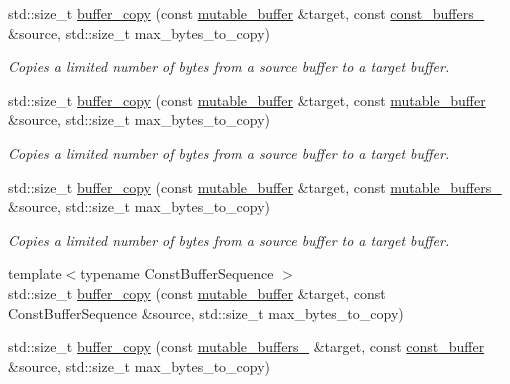\begin{DoxyCompactItemize}
std\+::size\+\_\+t \hyperlink{group__buffer__copy_ga9e6ea40e73105d4a5a73b24320feb59d}{buffer\+\_\+copy} (const \hyperlink{classasio_1_1mutable__buffer}{mutable\+\_\+buffer} \&target, const \hyperlink{classasio_1_1const__buffers__1}{const\+\_\+buffers\+\_} \&source, std\+::size\+\_\+t max\+\_\+bytes\+\_\+to\+\_\+copy)
\begin{DoxyCompactList}\small\item\em Copies a limited number of bytes from a source buffer to a target buffer. \end{DoxyCompactList}\item 
std\+::size\+\_\+t \hyperlink{group__buffer__copy_ga13c7347ac0eae54aea68d4b70d144a2e}{buffer\+\_\+copy} (const \hyperlink{classasio_1_1mutable__buffer}{mutable\+\_\+buffer} \&target, const \hyperlink{classasio_1_1mutable__buffer}{mutable\+\_\+buffer} \&source, std\+::size\+\_\+t max\+\_\+bytes\+\_\+to\+\_\+copy)
\begin{DoxyCompactList}\small\item\em Copies a limited number of bytes from a source buffer to a target buffer. \end{DoxyCompactList}\item 
std\+::size\+\_\+t \hyperlink{group__buffer__copy_ga4d1a32a028494196848be4e5347edd43}{buffer\+\_\+copy} (const \hyperlink{classasio_1_1mutable__buffer}{mutable\+\_\+buffer} \&target, const \hyperlink{classasio_1_1mutable__buffers__1}{mutable\+\_\+buffers\+\_} \&source, std\+::size\+\_\+t max\+\_\+bytes\+\_\+to\+\_\+copy)
\begin{DoxyCompactList}\small\item\em Copies a limited number of bytes from a source buffer to a target buffer. \end{DoxyCompactList}\item 
{\footnotesize template$<$typename Const\+Buffer\+Sequence $>$ }\\std\+::size\+\_\+t \hyperlink{group__buffer__copy_ga3c033d3e12841b6835b036344da2305f}{buffer\+\_\+copy} (const \hyperlink{classasio_1_1mutable__buffer}{mutable\+\_\+buffer} \&target, const Const\+Buffer\+Sequence \&source, std\+::size\+\_\+t max\+\_\+bytes\+\_\+to\+\_\+copy)
\item 
std\+::size\+\_\+t \hyperlink{group__buffer__copy_gacdaafbbc9b0024de24f208ccc933f6e3}{buffer\+\_\+copy} (const \hyperlink{classasio_1_1mutable__buffers__1}{mutable\+\_\+buffers\+\_} \&target, const \hyperlink{classasio_1_1const__buffer}{const\+\_\+buffer} \&source, std\+::size\+\_\+t max\+\_\+bytes\+\_\+to\+\_\+copy)

\end{DoxyCompactItemize}
